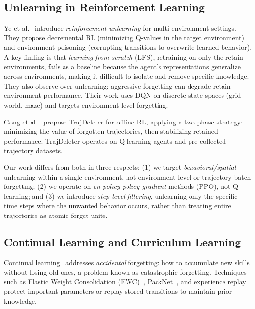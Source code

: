 \documentclass[sigconf]{acmart}
\begin{document}
\subsection{Unlearning in Reinforcement Learning}

Ye et al.~\cite{ye2024reinforcementunlearning} introduce \emph{reinforcement unlearning} for multi environment settings. They propose decremental RL (minimizing Q-values in the target environment) and environment poisoning (corrupting transitions to overwrite learned behavior). A key finding is that \emph{learning from scratch} (LFS), retraining on only the retain environments, fails as a baseline because the agent's representations generalize across environments, making it difficult to isolate and remove specific knowledge. They also observe over-unlearning: aggressive forgetting can degrade retain-environment performance. Their work uses DQN on discrete state spaces (grid world, maze) and targets environment-level forgetting.

Gong et al.~\cite{gong2024trajdeleterenablingtrajectoryforgetting} propose TrajDeleter for offline RL, applying a two-phase strategy: minimizing the value of forgotten trajectories, then stabilizing retained performance. TrajDeleter operates on Q-learning agents and pre-collected trajectory datasets.

Our work differs from both in three respects: (1) we target \emph{behavioral/spatial} unlearning within a single environment, not environment-level or trajectory-batch forgetting; (2) we operate on \emph{on-policy policy-gradient} methods (PPO), not Q-learning; and (3) we introduce \emph{step-level filtering}, unlearning only the specific time steps where the unwanted behavior occurs, rather than treating entire trajectories as atomic forget units.

\subsection{Continual Learning and Curriculum Learning}

Continual learning~\cite{Meng2025, huang2025lifelongreinforcementlearningsimilaritydriven} addresses \emph{accidental} forgetting: how to accumulate new skills without losing old ones, a problem known as catastrophic forgetting. Techniques such as Elastic Weight Consolidation (EWC)~\cite{kirkpatrick2017overcoming}, PackNet~\cite{mallya2018packnet}, and experience replay protect important parameters or replay stored transitions to maintain prior knowledge.
\end{document}
